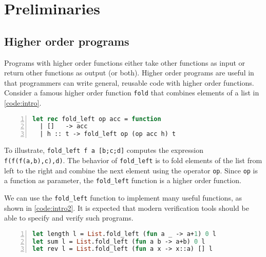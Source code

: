 
\chapter{Preliminaries}
\label{ch:preliminaries}
\vspace{2em}

\section{Higher order programs}

Programs with higher order functions either take other functions as input or return other functions as output (or both). Higher order programs are useful in that programmers can write general, reusable code with higher order functions. Consider a famous higher order function \texttt{fold} that combines elements of a list in \autoref{code:intro}.

\begin{lstlisting}[language=Caml, mathescape=true, xleftmargin=2em, aboveskip=1em, xrightmargin=1em, numbers=left, frame = {TB}, caption=Higher order function that combines list elements, label=code:intro]
let rec fold_left op acc = function
  | []   -> acc
  | h :: t -> fold_left op (op acc h) t
\end{lstlisting}

To illustrate, \texttt{fold\_left f a [b;c;d]} computes the expression
\texttt{f(f(f(a,b),c),d)}. The behavior of \texttt{fold\_left} is to 
fold elements of the list from left to the right and combine the next
element using the operator \texttt{op}. Since \texttt{op} is a 
function as parameter, the \texttt{fold\_left} function is a higher
order function.

We can use the \texttt{fold\_left} function to implement many useful functions, as shown in \autoref{code:intro2}. It is expected that modern verification tools should be able to specify and verify such programs.

\begin{lstlisting}[language=Caml, mathescape=true, xleftmargin=2em, aboveskip=1em, xrightmargin=1em, numbers=left, frame = {TB}, caption=\texttt{fold\_left} application examples, label=code:intro2]
let length l = List.fold_left (fun a _ -> a+1) 0 l
let sum l = List.fold_left (fun a b -> a+b) 0 l
let rev l = List.fold_left (fun a x -> x::a) [] l
\end{lstlisting}



